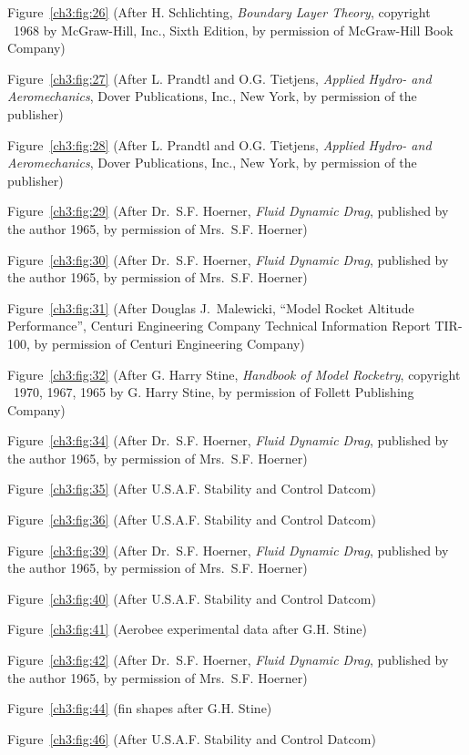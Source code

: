 Figure~\ref{ch3:fig:26} (After H. Schlichting, \emph{Boundary Layer Theory}, copyright
\textcopyright~1968 by McGraw-Hill, Inc., Sixth Edition, by permission of
McGraw-Hill Book Company)

Figure~\ref{ch3:fig:27} (After L. Prandtl and O.G. Tietjens, \emph{Applied Hydro- and
Aeromechanics}, Dover Publications, Inc., New York, by permission of the publisher)

Figure~\ref{ch3:fig:28} (After L. Prandtl and O.G. Tietjens, \emph{Applied Hydro- and
Aeromechanics}, Dover Publications, Inc., New York, by permission of the publisher)

Figure~\ref{ch3:fig:29} (After Dr.~S.F. Hoerner, \emph{Fluid Dynamic Drag}, published
by the author 1965, by permission of Mrs.~S.F. Hoerner)

Figure~\ref{ch3:fig:30} (After Dr.~S.F. Hoerner, \emph{Fluid Dynamic Drag}, published
by the author 1965, by permission of Mrs.~S.F. Hoerner)

Figure~\ref{ch3:fig:31} (After Douglas J.~Malewicki, ``Model Rocket Altitude
Performance'', Centuri Engineering Company Technical Information
Report TIR-100, by permission of Centuri Engineering Company)

Figure~\ref{ch3:fig:32} (After G. Harry Stine, \emph{Handbook of Model Rocketry},
copyright \textcopyright~1970, 1967, 1965 by G. Harry Stine, by permission
of Follett Publishing Company)

Figure~\ref{ch3:fig:34} (After Dr.~S.F. Hoerner, \emph{Fluid Dynamic Drag}, published
by the author 1965, by permission of Mrs.~S.F. Hoerner)

Figure~\ref{ch3:fig:35} (After U.S.A.F. Stability and Control Datcom)

Figure~\ref{ch3:fig:36} (After U.S.A.F. Stability and Control Datcom)

Figure~\ref{ch3:fig:39} (After Dr.~S.F. Hoerner, \emph{Fluid Dynamic Drag}, published
by the author 1965, by permission of Mrs.~S.F. Hoerner)

Figure~\ref{ch3:fig:40} (After U.S.A.F. Stability and Control Datcom)

Figure~\ref{ch3:fig:41} (Aerobee experimental data after G.H. Stine)

Figure~\ref{ch3:fig:42} (After Dr.~S.F. Hoerner, \emph{Fluid Dynamic Drag}, published
by the author 1965, by permission of Mrs.~S.F. Hoerner)

Figure~\ref{ch3:fig:44} (fin shapes after G.H. Stine)

Figure~\ref{ch3:fig:46} (After U.S.A.F. Stability and Control Datcom)

